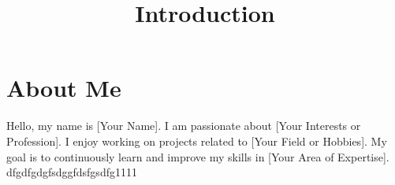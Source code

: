 \documentclass{article}
\begin{document}
\title{Introduction}
\author{}
\date{}

\maketitle
\section{About Me}
Hello, my name is [Your Name]. I am passionate about [Your Interests or Profession]. I enjoy working on projects related to [Your Field or Hobbies]. My goal is to continuously learn and improve my skills in [Your Area of Expertise].
dfgdfgdgfsdggfdsfgsdfg1111
\end{document}
